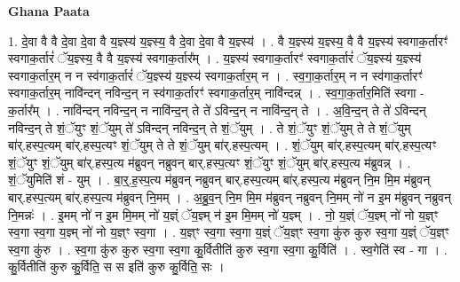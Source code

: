 \documentclass[17pt]{extarticle}
\begin{document}
\textbf{Ghana Paata } \newline

1. दे॒वा वै वै दे॒वा दे॒वा वै य॒ज्ञ्स्य॑ य॒ज्ञ्स्य॒ वै दे॒वा दे॒वा वै य॒ज्ञ्स्य॑ । . वै य॒ज्ञ्स्य॑ य॒ज्ञ्स्य॒ वै वै य॒ज्ञ्स्य॑ स्वगाक॒र्तारꣳ॑ स्वगाक॒र्तारं॑ ॅय॒ज्ञ्स्य॒ वै वै य॒ज्ञ्स्य॑ स्वगाक॒र्तार᳚म् । . य॒ज्ञ्स्य॑ स्वगाक॒र्तारꣳ॑ स्वगाक॒र्तारं॑ ॅय॒ज्ञ्स्य॑ य॒ज्ञ्स्य॑ स्वगाक॒र्तार॒म् न न स्व॑गाक॒र्तारं॑ ॅय॒ज्ञ्स्य॑ य॒ज्ञ्स्य॑ स्वगाक॒र्तार॒म् न । . स्व॒गा॒क॒र्तार॒म् न न स्व॑गाक॒र्तारꣳ॑ स्वगाक॒र्तार॒म् नावि॑न्दन् नविन्द॒न् न स्व॑गाक॒र्तारꣳ॑ स्वगाक॒र्तार॒म् नावि॑न्दन्न् । . स्व॒गा॒क॒र्तार॒मिति॑ स्वगा - क॒र्तार᳚म् । . नावि॑न्दन् नविन्द॒न् न नावि॑न्द॒न् ते ते॑ ऽविन्द॒न् न नावि॑न्द॒न् ते । . अ॒वि॒न्द॒न् ते ते॑ ऽविन्दन् नविन्द॒न् ते शं॒ॅयुꣳ शं॒ॅयुम् ते॑ ऽविन्दन् नविन्द॒न् ते शं॒ॅयुम् । . ते शं॒ॅयुꣳ शं॒ॅयुम् ते ते शं॒ॅयुम् बा॑र्.हस्प॒त्यम् बा॑र्.हस्प॒त्यꣳ शं॒ॅयुम् ते ते शं॒ॅयुम् बा॑र्.हस्प॒त्यम् । . शं॒ॅयुम् बा॑र्.हस्प॒त्यम् बा॑र्.हस्प॒त्यꣳ शं॒ॅयुꣳ शं॒ॅयुम् बा॑र्.हस्प॒त्य म॑ब्रुवन् नब्रुवन् बार्.हस्प॒त्यꣳ शं॒ॅयुꣳ शं॒ॅयुम् बा॑र्.हस्प॒त्य म॑ब्रुवन्न् । . शं॒ॅयुमिति॑ शं - युम् । . बा॒र्॒.ह॒स्प॒त्य म॑ब्रुवन् नब्रुवन् बार्.हस्प॒त्यम् बा॑र्.हस्प॒त्य म॑ब्रुवन् नि॒म मि॒म म॑ब्रुवन् बार्.हस्प॒त्यम् बा॑र्.हस्प॒त्य म॑ब्रुवन् नि॒मम् । . अ॒ब्रु॒व॒न् नि॒म मि॒म म॑ब्रुवन् नब्रुवन् नि॒मम् नो॑ न इ॒म म॑ब्रुवन् नब्रुवन् नि॒मन्नः॑ । . इ॒मम् नो॑ न इ॒म मि॒मम् नो॑ य॒ज्ञ्ं ॅय॒ज्ञ्म् न॑ इ॒म मि॒मम् नो॑ य॒ज्ञ्म् । . नो॒ य॒ज्ञ्ं ॅय॒ज्ञ्म् नो॑ नो य॒ज्ञ्ꣳ स्व॒गा स्व॒गा य॒ज्ञ्म् नो॑ नो य॒ज्ञ्ꣳ स्व॒गा । . य॒ज्ञ्ꣳ स्व॒गा स्व॒गा य॒ज्ञ्ं ॅय॒ज्ञ्ꣳ स्व॒गा कु॑रु कुरु स्व॒गा य॒ज्ञ्ं ॅय॒ज्ञ्ꣳ स्व॒गा कु॑रु । . स्व॒गा कु॑रु कुरु स्व॒गा स्व॒गा कु॒र्वितीति॑ कुरु स्व॒गा स्व॒गा कु॒र्विति॑ । . स्व॒गेति॑ स्व - गा । . कु॒र्वितीति॑ कुरु कु॒र्विति॒ स स इति॑ कुरु कु॒र्विति॒ सः । \newline
\end{document}
